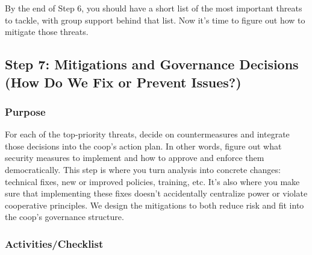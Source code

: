 By the end of Step 6, you should have a short list of the most important threats
to tackle, with group support behind that list. Now it's time to figure out how
to mitigate those threats.


\subsection{Step 7: Mitigations and Governance Decisions (How Do We Fix or Prevent Issues?)}
\label{subsec:Step7}

\subsubsection{Purpose}

For each of the top-priority threats, decide on countermeasures and integrate
those decisions into the coop's action plan. In other words, figure out what
security measures to implement and how to approve and enforce them
democratically. This step is where you turn analysis into concrete changes:
technical fixes, new or improved policies, training, etc. It's also where you
make sure that implementing these fixes doesn't accidentally centralize power or
violate cooperative principles. We design the mitigations to both reduce risk
and fit into the coop's governance structure.

\subsubsection{Activities/Checklist}

